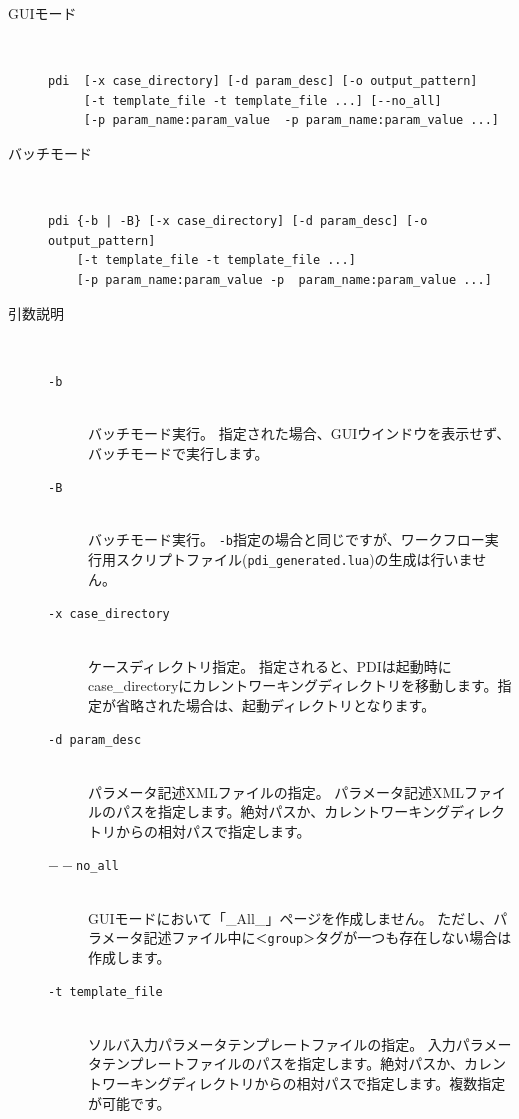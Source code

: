 \documentclass[a4paper,11pt]{jarticle}
\begin{document}
\begin{description}
\item[GUIモード] {\ }
\begin{verbatim}
pdi  [-x case_directory] [-d param_desc] [-o output_pattern]
     [-t template_file -t template_file ...] [--no_all]
     [-p param_name:param_value  -p param_name:param_value ...]
\end{verbatim}

\item[バッチモード] {\ }
\begin{verbatim}
pdi {-b | -B} [-x case_directory] [-d param_desc] [-o output_pattern]
    [-t template_file -t template_file ...]
    [-p param_name:param_value -p  param_name:param_value ...]
\end{verbatim}

\item[引数説明] {\ }
\begin{description}
\item[{\tt -b}] {\ }\\
バッチモード実行。
指定された場合、GUIウインドウを表示せず、バッチモードで実行します。
\item[{\tt -B}] {\ }\\
バッチモード実行。
{\tt -b}指定の場合と同じですが、ワークフロー実行用スクリプトファイル({\tt pdi\_generated.lua})の生成は行いません。
\item[{\tt -x  case\_directory}] {\ }\\
ケースディレクトリ指定。
指定されると、PDIは起動時にcase\_directoryにカレントワーキングディレクトリを移動します。指定が省略された場合は、起動ディレクトリとなります。

\item[{\tt -d  param\_desc}] {\ }\\
パラメータ記述XMLファイルの指定。
パラメータ記述XMLファイルのパスを指定します。絶対パスか、カレントワーキングディレクトリからの相対パスで指定します。

\item[{\tt $--$no\_all}] {\ }\\ 
GUIモードにおいて「\_All\_」ページを作成しません。
ただし、パラメータ記述ファイル中に{\tt ＜group＞}タグが一つも存在しない場合は
作成します。

\item[{\tt -t  template\_file}] {\ }\\
ソルバ入力パラメータテンプレートファイルの指定。
入力パラメータテンプレートファイルのパスを指定します。絶対パスか、カレントワーキングディレクトリからの相対パスで指定します。複数指定が可能です。


\end{description}
\end{description}
\end{document}
